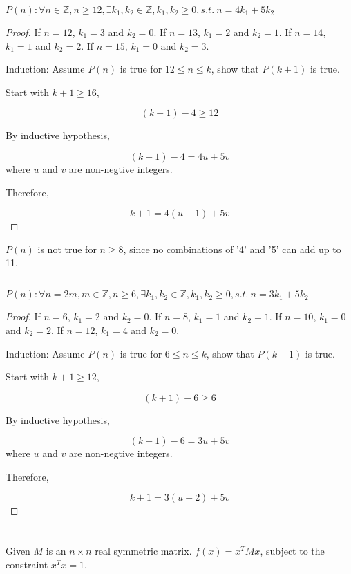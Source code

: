 \documentclass{article}
\theoremstyle{definition} %
\newcommand{\ZZ}{\mathbb{Z}}
\begin{document}
$P(n): \forall n\in \ZZ ,n\ge 12, \exists k_1, k_2 \in \ZZ, k_1, k_2 \ge 0, s.t.\ n=4k_1+5k_2$

\begin{proof}
If $n =12$, $k_1 = 3$ and $ k_2 = 0$.
If $n =13$, $k_1 = 2$ and $ k_2 = 1$.
If $n =14$, $k_1 = 1$ and $ k_2 = 2$.
If $n =15$, $k_1 = 0$ and $ k_2 = 3$.

Induction: Assume $P(n)$ is true for $12\le n\le k$, show that $P(k+1)$ is true.

Start with $k+1\ge 16$,

$$ (k+1)-4 \ge 12$$

By inductive hypothesis,

$$ (k+1)-4 = 4u+5v$$
where $u$ and $v$ are non-negtive integers.

Therefore,

$$ k+1 = 4(u+1) + 5v$$
\end{proof}

$P(n)$ is not true for $ n\ge 8$, since no combinations of '4' and '5' can add up to 11.

\subsection{}
$P(n): \forall n=2m, m\in \ZZ , n\ge 6, \exists k_1, k_2 \in \ZZ, k_1, k_2 \ge 0, s.t.\ n=3k_1+5k_2$

\begin{proof}
    If $n =6$, $k_1 = 2$ and $ k_2 = 0$.
    If $n =8$, $k_1 = 1$ and $ k_2 = 1$.
    If $n =10$, $k_1 = 0$ and $ k_2 = 2$.
    If $n =12$, $k_1 = 4$ and $ k_2 = 0$.
    
    Induction: Assume $P(n)$ is true for $6\le n\le k$, show that $P(k+1)$ is true.
    
    Start with $k+1\ge 12$,
    
    $$ (k+1)-6 \ge 6$$
    
    By inductive hypothesis,
    
    $$ (k+1)-6 = 3u+5v$$
    where $u$ and $v$ are non-negtive integers.
    
    Therefore,
    
    $$ k+1 = 3(u+2) + 5v$$
\end{proof}

\section{}
Given $M$ is an $n\times n$ real symmetric matrix. $f(x) = x^TMx$, subject to the constraint $x^Tx =1$.
\end{document}
